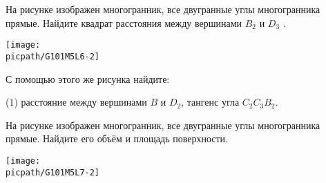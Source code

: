 \begin{class}[number=2]
	\begin{listofex}
		\item 
		\begin{minipage}[t]{\bodywidth}
			На рисунке изображен многогранник, все двугранные углы многогранника прямые. Найдите квадрат расстояния между вершинами \(B_2\) и \(D_3\) .
		\end{minipage}
		\hspace{0.02\linewidth}
		\begin{minipage}[t]{\picwidth}
			\texttt{[image: \\picpath/G101M5L6-2]}
		\end{minipage}
		\item С помощью этого же рисунка найдите:
		\begin{tasks}(1)
			\task расстояние между вершинами \(B\) и \(D_2\),
			\task тангенс угла \(C_2C_3B_2\).
		\end{tasks}
		\item 
		\begin{minipage}[t]{\bodywidth}
			На рисунке изображен многогранник, все двугранные углы многогранника прямые. Найдите его объём и площадь поверхности.
		\end{minipage}
		\hspace{0.02\linewidth}
		\begin{minipage}[t]{\picwidth}
			\texttt{[image: \\picpath/G101M5L7-2]}
		\end{minipage}


\end{listofex}
\end{class}
